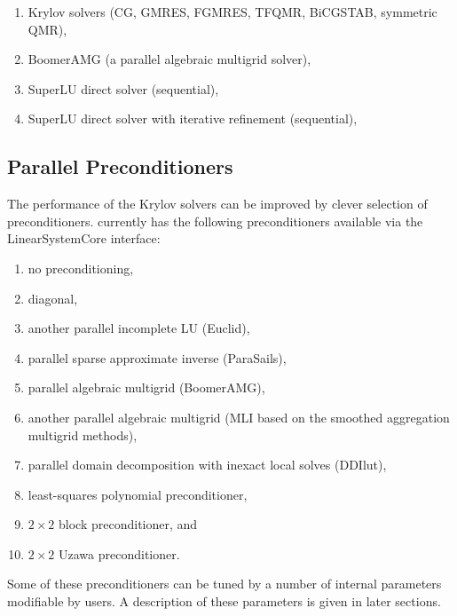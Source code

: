 \begin{enumerate}
\item Krylov solvers (CG, GMRES, FGMRES, TFQMR, BiCGSTAB, symmetric QMR),
\item BoomerAMG (a parallel algebraic multigrid solver),
\item SuperLU direct solver (sequential),
\item SuperLU direct solver with iterative refinement (sequential),
\end{enumerate}
                                                                                
\subsection{Parallel Preconditioners}
                                                                                
The performance of the Krylov solvers can be improved by clever selection
of preconditioners. \hypre{} currently has the following preconditioners
available via the {\sf LinearSystemCore} interface:
                                                                                
\begin{enumerate}
\item no preconditioning,
\item diagonal,
\item another parallel incomplete LU ({\sf Euclid}),
\item parallel sparse approximate inverse ({\sf ParaSails}),
\item parallel algebraic multigrid ({\sf BoomerAMG}),
\item another parallel algebraic multigrid ({\sf MLI} based on
the smoothed aggregation multigrid methods),
\item parallel domain decomposition with inexact local solves ({\sf DDIlut}),
\item least-squares polynomial preconditioner,
\item $2 \times 2$ block preconditioner, and
\item $2 \times 2$ Uzawa preconditioner.
\end{enumerate}
                                                                                
Some of these preconditioners can be tuned by a number of internal parameters
modifiable by users. A description of these parameters is given in later
sections.
                                                                                
